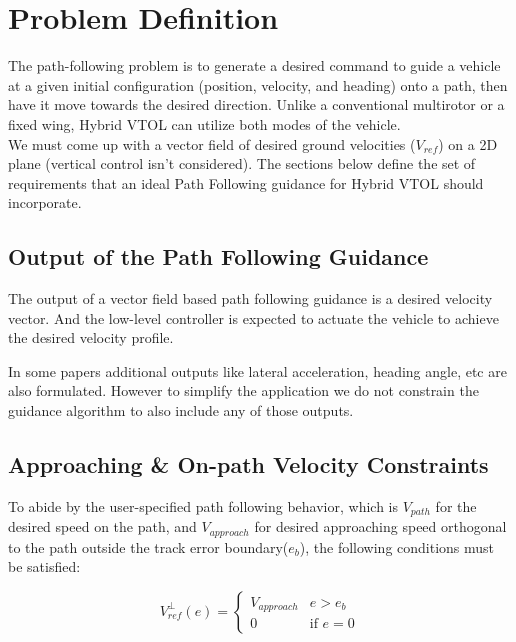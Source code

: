 \chapter{Problem Definition}
\label{ch:problem_definition}

The path-following problem is to generate a desired command to guide a vehicle at a given initial configuration (position, velocity, and heading) onto a path, then have it move towards the desired direction. Unlike a conventional multirotor or a fixed wing, Hybrid VTOL can utilize both modes of the vehicle.\\

We must come up with a vector field of desired ground velocities ($V_{ref}$) on a 2D plane (vertical control isn't considered). The sections below define the set of requirements that an ideal Path Following guidance for Hybrid VTOL should incorporate.

\section{Output of the Path Following Guidance}
The output of a vector field based path following guidance is a desired velocity vector. And the low-level controller is expected to actuate the vehicle to achieve the desired velocity profile.

In some papers additional outputs like lateral acceleration, heading angle, etc are also formulated. However to simplify the application we do not constrain the guidance algorithm to also include any of those outputs.

\section{Approaching \& On-path Velocity Constraints}
\label{seq:approach_on_path_vel_constraints}

To abide by the user-specified path following behavior, which is $V_{path}$ for the desired speed on the path, and $V_{approach}$ for desired approaching speed orthogonal to the path outside the track error boundary($e_b$), the following conditions must be satisfied:

\begin{equation}
    V_{ref}^{\perp}(e)=\begin{cases}
    V_{approach}& \text{$e > e_b$}\\
    0& \text{if $e = 0$}
\end{cases}
\label{eq:v_orth_constraints}
\end{equation}

